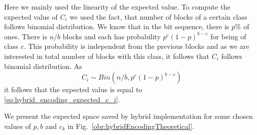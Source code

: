 Here we mainly used the linearity of the expected value. To compute the expected value of
$C_i$ we used the fact, that number of blocks of a certain class follows binomial
distribution. We know that in the bit sequence, there is $p\%$ of ones. There is $n/b$ blocks
and each has probability $p^c(1-p)^{b-c}$ for being of class $c$. This probability is independent
from the previous blocks and as we are interested in total number of blocks with this class,
it follows that $C_i$ follows binomial distribution. As $$C_i \sim Bin(n/b, p^c(1-p)^{b-c})$$
it follows that the expected value is equal to \ref{eq:hybrid_encoding_expected_c_i}.

We present the expected space saved by hybrid implementation for some chosen values of
$p, b$ and $c_k$ in Fig.~\ref{obr:hybridEncodingTheoretical}.

